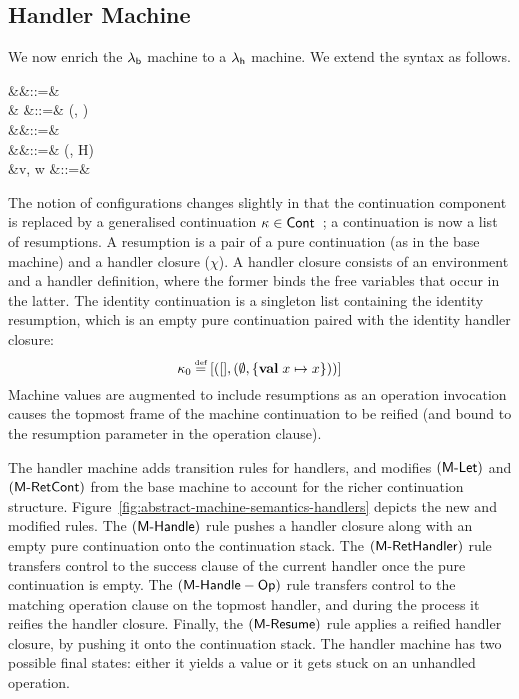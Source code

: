 \documentclass[12pt,phd,lfcs,twoside,openright,logo,leftchapter,normalheadings]{infthesis}
\theoremstyle{plain}
\theoremstyle{definition}
\begin{document}
\subsection{Handler Machine}
\newcommand{\HClosure}{\dec{HClo}}
We now enrich the $\lambda_{\mathsf{b}}$ machine to a $\lambda_{\mathsf{h}}$ machine.
%
We extend the syntax as follows.
%
{\small
\begin{syntax}
              &\conf \in \Conf &::=& \\
                 &\rho \in {} &::=& (\sigma, \chi)\\
               &\kappa \in \Cont &::=& \nil \mid \rho \cons \kappa\\
            &\chi \in \HClosure   &::=& (\env, H) \\
              &v, w \in \MVal  &::=& \cdots \mid \rho \\
\end{syntax}}%
%
The notion of configurations changes slightly in that the continuation
component is replaced by a generalised continuation
$\kappa \in \mathsf{Cont}$~\cite{HillerstromLA20}; a continuation is now a
list of resumptions. A resumption is a pair of a pure continuation (as
in the base machine) and a handler closure ($\chi$).
%
A handler closure consists of an environment and a handler definition,
where the former binds the free variables that occur in the latter.
%
The identity continuation is a singleton list containing the identity
resumption, which is an empty pure continuation paired with the
identity handler closure:
%
{\small
\[
\kappa_0 \defas [(\nil, (\emptyset, \{\Val\;x \mapsto x\}))]
\]}%
%
Machine values are augmented to include resumptions as an operation
invocation causes the topmost frame of the machine continuation to be
reified (and bound to the resumption parameter in the operation
clause).
%

The handler machine adds transition rules for handlers, and modifies
$(\mathsf{M\textrm{-}Let})$ and $(\mathsf{M\textrm{-}RetCont})$ from the base machine to account
for the richer continuation
structure. Figure~\ref{fig:abstract-machine-semantics-handlers}
depicts the new and modified rules.
%
The $(\mathsf{M\textrm{-}Handle})$ rule pushes a handler closure along with an
empty pure continuation onto the continuation stack.
%
The $(\mathsf{M\textrm{-}RetHandler})$ rule transfers control to the success clause
of the current handler once the pure continuation is empty.
%
The $(\mathsf{M\textrm{-}Handle-Op})$ rule transfers control to the matching
operation clause on the topmost handler, and during the process it
reifies the handler closure. Finally, the $(\mathsf{M\textrm{-}Resume})$ rule
applies a reified handler closure, by pushing it onto the continuation
stack.
%
The handler machine has two possible final states: either it yields a
value or it gets stuck on an unhandled operation.
\end{document}
